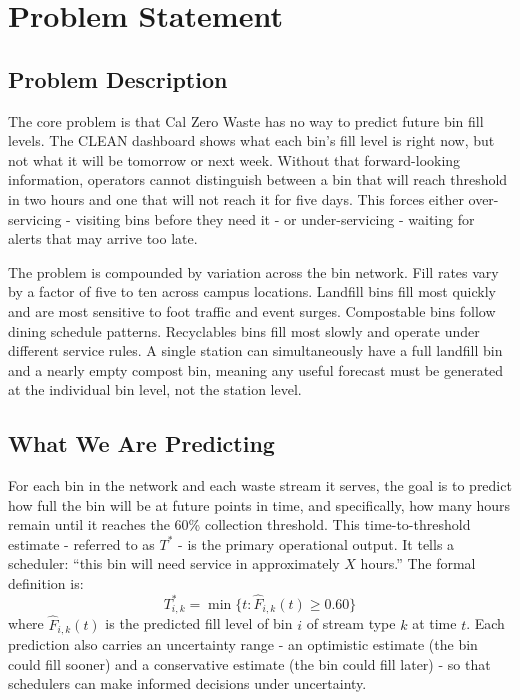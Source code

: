 \documentclass[11pt]{article}
\begin{document}
\section{Problem Statement}

\subsection{Problem Description}

The core problem is that Cal Zero Waste has no way to predict future bin fill levels. The
CLEAN dashboard shows what each bin's fill level is right now, but not what it will be
tomorrow or next week. Without that forward-looking information, operators cannot
distinguish between a bin that will reach threshold in two hours and one that will not
reach it for five days. This forces either over-servicing - visiting bins before they need
it - or under-servicing - waiting for alerts that may arrive too late.

The problem is compounded by variation across the bin network. Fill rates vary by a factor
of five to ten across campus locations. Landfill bins fill most quickly and are most
sensitive to foot traffic and event surges. Compostable bins follow dining schedule
patterns. Recyclables bins fill most slowly and operate under different service rules. A
single station can simultaneously have a full landfill bin and a nearly empty compost bin,
meaning any useful forecast must be generated at the individual bin level, not the station
level.

\subsection{What We Are Predicting}

For each bin in the network and each waste stream it serves, the goal is to predict how
full the bin will be at future points in time, and specifically, how many hours remain
until it reaches the 60\% collection threshold. This time-to-threshold estimate - referred
to as $T^*$ - is the primary operational output. It tells a scheduler: ``this bin will
need service in approximately $X$ hours.'' The formal definition is:
\[
  T^*_{i,k} = \min\bigl\{t : \hat{F}_{i,k}(t) \geq 0.60\bigr\}
\]
where $\hat{F}_{i,k}(t)$ is the predicted fill level of bin $i$ of stream type $k$ at
time $t$. Each prediction also carries an uncertainty range - an optimistic estimate (the
bin could fill sooner) and a conservative estimate (the bin could fill later) - so that
schedulers can make informed decisions under uncertainty.
\end{document}
